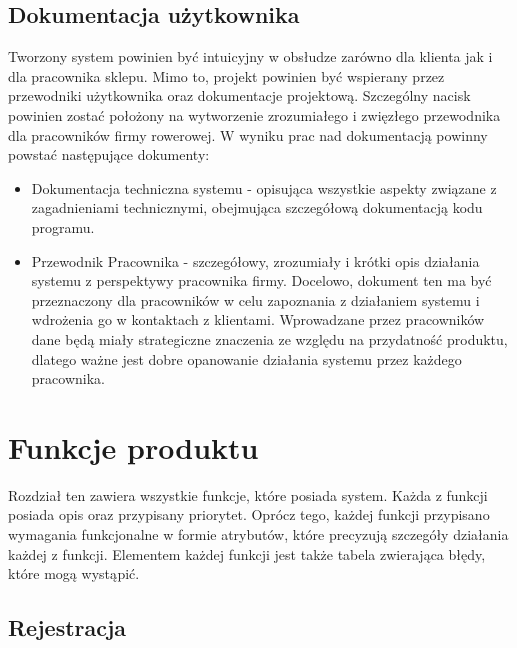 \documentclass[a4paper,20pt]{article}
\begin{document}
\subsection{Dokumentacja użytkownika}
Tworzony system powinien być intuicyjny w obsłudze zarówno dla klienta jak i dla pracownika sklepu. Mimo to, projekt powinien być wspierany przez przewodniki użytkownika oraz dokumentacje projektową. Szczególny nacisk powinien zostać położony na wytworzenie zrozumiałego i zwięzłego przewodnika dla pracowników firmy rowerowej. W wyniku prac nad dokumentacją powinny powstać następujące dokumenty: \\
\begin{itemize}
\item Dokumentacja techniczna systemu - opisująca wszystkie aspekty związane z zagadnieniami technicznymi, obejmująca szczegółową dokumentacją kodu programu. \\
\item Przewodnik Pracownika - szczegółowy, zrozumiały i krótki opis działania systemu z perspektywy pracownika firmy. Docelowo, dokument ten ma być przeznaczony dla pracowników w celu zapoznania z działaniem systemu i wdrożenia go w kontaktach z klientami. Wprowadzane przez pracowników dane będą miały strategiczne znaczenia ze względu na przydatność produktu, dlatego ważne jest dobre opanowanie działania systemu przez każdego pracownika.
\end{itemize}  


\newpage
\section{Funkcje produktu}

Rozdział ten zawiera wszystkie funkcje, które posiada system. Każda z funkcji posiada opis oraz przypisany priorytet. Oprócz tego, każdej funkcji przypisano wymagania funkcjonalne w formie atrybutów, które precyzują szczegóły działania każdej z funkcji. Elementem każdej funkcji jest także tabela zwierająca błędy, które mogą wystąpić.

\subsection{Rejestracja}
\end{document}
